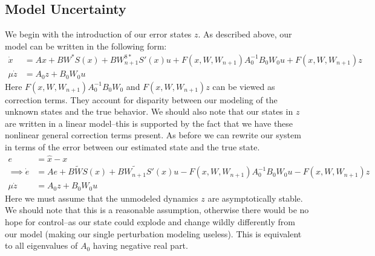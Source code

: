\documentclass[12pt, letterpaper]{article}
\begin{document}
	\subsection{Model Uncertainty}
	We begin with the introduction of our error states $z$. As described above, our model can be written in the following form:
	\begin{align*}
			\dot{x} &= Ax +BW^{*}S(x)+BW^{8*}_{n+1}S'(x)u + F(x,W,W_{n+1})A_{0}^{-1}B_{0}W_{0}u+F(x,W,W_{n+1})z \\
			\mu\dot{z} &= A_{0}z+B_{0}W_{0}u
	\end{align*}
	Here  $ F(x,W,W_{n+1})A_{0}^{-1}B_{0}W_{0}$ and $F(x,W,W_{n+1})z$ can be viewed as correction terms. They account for disparity between our modeling of the unknown states and the true behavior. We should also  note that our states in $z$ are written in a linear model--this is supported by the fact that we have these nonlinear general correction terms present. 
	As before we can rewrite our system in terms of the error between our estimated state and the true state. 
	\begin{align*}
			e&= \hat{x}-x \\
		\implies \dot{e} &= Ae+B\tilde{W}S(x)+B\tilde{W_{n+1}}S'(x)u -F(x,W,W_{n+1})A_{0}^{-1}B_{0}W_{0}u-F(x,W,W_{n+1})z \\
		\mu\dot{z} &= A_{0}z+B_{0}W_{0}u
	\end{align*}
	Here we must assume that the unmodeled dynamics $z$ are asymptotically stable. We should note that this is a reasonable assumption, otherwise there would be no hope for control--as our state could explode and change wildly differently from our model (making our single perturbation modeling useless). This is equivalent to all eigenvalues of $A_{0}$ having negative real part.
	
\end{document}
